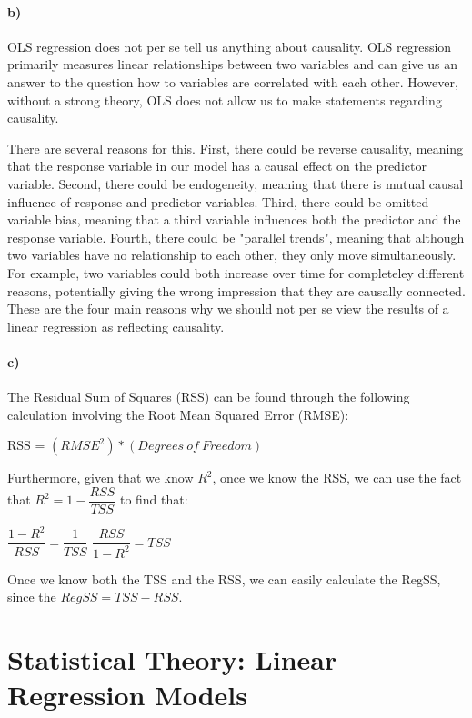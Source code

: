 \documentclass[12pt]{article}\usepackage[]{graphicx}\usepackage[]{color}
\begin{document}
\paragraph*{b)} OLS regression does not per se tell us anything about causality. OLS regression primarily measures linear relationships between two variables and can give us an answer to the question how to variables are correlated with each other. However, without a strong theory, OLS does not allow us to make statements regarding causality.

There are several reasons for this. First, there could be reverse causality, meaning that the response variable in our model has a causal effect on the predictor variable. Second, there could be endogeneity, meaning that there is mutual causal influence of response and predictor variables. Third, there could be omitted variable bias, meaning that a third variable influences both the predictor and the response variable. Fourth, there could be "parallel trends", meaning that although two variables have no relationship to each other, they only move simultaneously. For example, two variables could both increase over time for completeley different reasons, potentially giving the wrong impression that they are causally connected. These are the four main reasons why we should not per se view the results of a linear regression as reflecting causality.

\paragraph*{c)} The Residual Sum of Squares (RSS) can be found through the following calculation involving the Root Mean Squared Error (RMSE):

\bigskip

RSS = $(RMSE^2)*(Degrees\ of \ Freedom)$

\bigskip

Furthermore, given that we know $R^2$, once we know the RSS, we can use the fact that $R^2 = 1 - \dfrac{RSS}{TSS}$ to find that:

\bigskip

$\dfrac{1 - R^2}{RSS} = \dfrac{1}{TSS}$ \rightarrow $\dfrac{RSS}{1 - R^2} = TSS$

\bigskip

Once we know both the TSS and the RSS, we can easily calculate the RegSS, since the $RegSS = TSS - RSS$.



\section*{Statistical Theory: Linear Regression Models}
\end{document}
